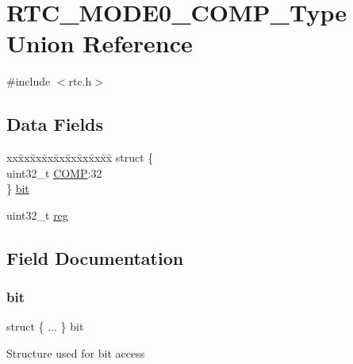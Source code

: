 \hypertarget{union_r_t_c___m_o_d_e0___c_o_m_p___type}{}\section{R\+T\+C\+\_\+\+M\+O\+D\+E0\+\_\+\+C\+O\+M\+P\+\_\+\+Type Union Reference}
\label{union_r_t_c___m_o_d_e0___c_o_m_p___type}


{\ttfamily \#include $<$rtc.\+h$>$}

\subsection*{Data Fields}
\begin{DoxyCompactItemize}
\item 
\begin{tabbing}
xx\=xx\=xx\=xx\=xx\=xx\=xx\=xx\=xx\=\kill
struct \{\\
\>uint32\_t \mbox{\hyperlink{union_r_t_c___m_o_d_e0___c_o_m_p___type_aa1352530035b6609791c19fda0cc2fb6}{COMP}}:32\\
\} \mbox{\hyperlink{union_r_t_c___m_o_d_e0___c_o_m_p___type_a60e4ebfdbfa1c76a9ae703d2cd08b1b6}{bit}}\\

\end{tabbing}\item 
uint32\+\_\+t \mbox{\hyperlink{union_r_t_c___m_o_d_e0___c_o_m_p___type_a6b91636401516a477989a336376d7b40}{reg}}
\end{DoxyCompactItemize}


\subsection{Field Documentation}
\mbox{\label{union_r_t_c___m_o_d_e0___c_o_m_p___type_a60e4ebfdbfa1c76a9ae703d2cd08b1b6}} 
\subsubsection{\texorpdfstring{bit}{bit}}
{\footnotesize\ttfamily struct \{ ... \}   bit}

Structure used for bit access \mbox{\label{union_r_t_c___m_o_d_e0___c_o_m_p___type_aa1352530035b6609791c19fda0cc2fb6}} 
